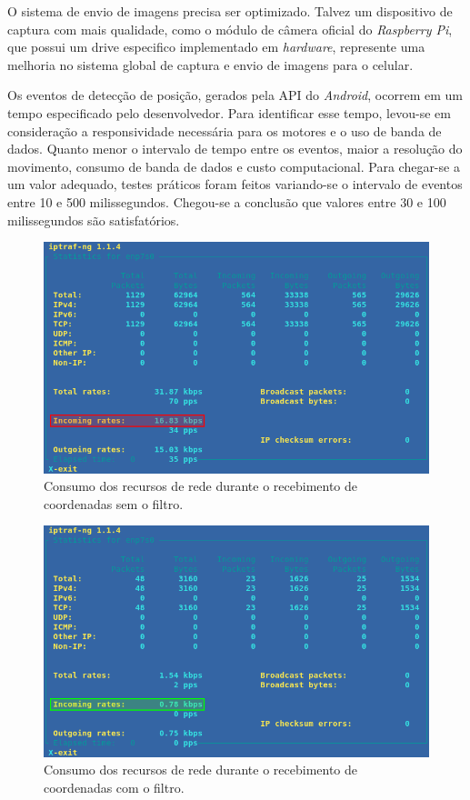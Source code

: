 O sistema de envio de imagens precisa ser optimizado. Talvez um dispositivo de captura com mais qualidade, como o módulo de câmera oficial do \textit{Raspberry Pi}, que possui um drive especifico implementado em \textit{hardware}, represente uma melhoria no sistema global de captura e envio de imagens para o celular.\par

Os eventos de detecção de posição, gerados pela API do \textit{Android}, ocorrem em um tempo especificado pelo desenvolvedor. Para identificar esse tempo, levou-se em consideração a responsividade necessária para os motores e o uso de banda de dados. Quanto menor o intervalo de tempo entre os eventos, maior a resolução do movimento,  consumo de banda de dados e custo computacional. Para chegar-se a um valor adequado, testes práticos foram feitos variando-se o intervalo de eventos entre 10 e 500 milissegundos. Chegou-se a conclusão que valores entre 30 e 100 milissegundos são satisfatórios.\par

\begin{figure}[H]
	\centering
	\includegraphics[width=1\textwidth]{figuras/consumo_banda_unfiltered.png}
	\caption{Consumo dos recursos de rede durante o recebimento de coordenadas sem o filtro.}
	\label{fig:consumo_banda_coord_unfiltered}
\end{figure}

\begin{figure}[H]
	\centering
	\includegraphics[width=1\textwidth]{figuras/consumo_banda_filtered.png}
	\caption{Consumo dos recursos de rede durante o recebimento de coordenadas com o filtro.}
	\label{fig:consumo_banda_coord_filtered}
\end{figure}

